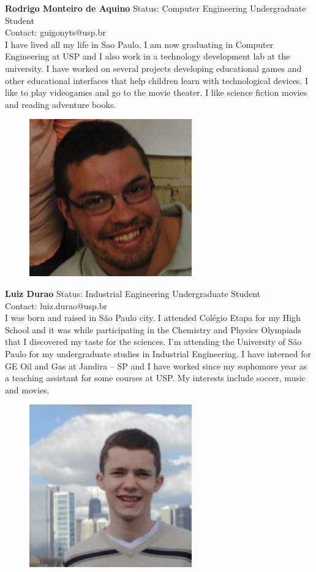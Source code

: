 \textbf{Rodrigo Monteiro de Aquino}
Status: Computer Engineering Undergraduate Student \\
Contact: guigonyts@usp.br \\
I have lived all my life in Sao Paulo. I am now graduating in Computer Engineering at USP and I also work in a technology development lab at the university. I have worked on several projects developing educational games and other educational interfaces that help children learn with technological devices.  I like to play videogames and go to the movie theater. I like science fiction movies and reading adventure books.

\begin{figure}[h]
  \centering
     \includegraphics[width=7cm]{images/image015}
  \label{fig:15}
\end{figure}

\textbf{Luiz Durao}
Status: Industrial Engineering Undergraduate Student \\
Contact: luiz.durao@usp.br \\
I was born and raised in São Paulo city. I attended Colégio Etapa for my High School and it was while participating in the Chemistry and Physics Olympiads that I discovered my taste for the sciences. I'm attending the University of São Paulo for my undergraduate studies in Industrial Engineering. I have interned for GE Oil and Gas at Jandira – SP and I have worked since my sophomore year as a teaching assistant for some courses at USP. My interests include soccer, music and movies.

\begin{figure}[h]
  \centering
     \includegraphics[width=7cm]{images/image016}
  \label{fig:16}
\end{figure}

